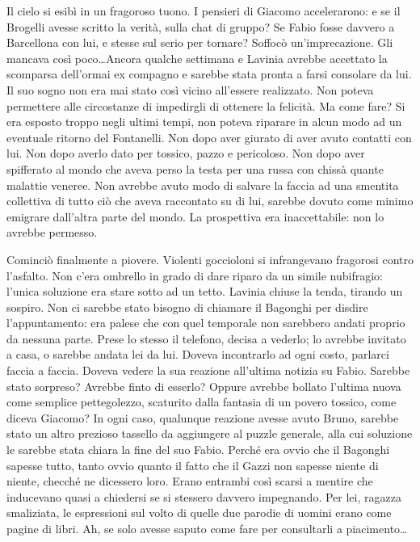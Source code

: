 Il cielo si esibì in un fragoroso tuono. I pensieri di Giacomo accelerarono: e se il Brogelli avesse scritto la verità, sulla chat di gruppo? Se Fabio fosse davvero a Barcellona con lui, e stesse sul serio per tornare? Soffocò un'imprecazione. Gli mancava così poco\ldots Ancora qualche settimana e Lavinia avrebbe accettato la scomparsa dell'ormai ex compagno e sarebbe stata pronta a farsi consolare da lui. Il suo sogno non era mai stato così vicino all'essere realizzato. Non poteva permettere alle circostanze di impedirgli di ottenere la felicità. Ma come fare? Si era esposto troppo negli ultimi tempi, non poteva riparare in alcun modo ad un eventuale ritorno del Fontanelli. Non dopo aver giurato di aver avuto contatti con lui. Non dopo averlo dato per tossico, pazzo e pericoloso. Non dopo aver spifferato al mondo che aveva perso la testa per una russa con chissà quante malattie veneree. Non avrebbe avuto modo di salvare la faccia ad una smentita collettiva di tutto ciò che aveva raccontato su di lui, sarebbe dovuto come minimo emigrare dall'altra parte del mondo. La prospettiva era inaccettabile: non lo avrebbe permesso.

Cominciò finalmente a piovere. Violenti goccioloni si infrangevano fragorosi contro l'asfalto. Non c'era ombrello in grado di dare riparo da un simile nubifragio: l'unica soluzione era stare sotto ad un tetto. Lavinia chiuse la tenda, tirando un sospiro. Non ci sarebbe stato bisogno di chiamare il Bagonghi per disdire l'appuntamento: era palese che con quel temporale non sarebbero andati proprio da nessuna parte. Prese lo stesso il telefono, decisa a vederlo; lo avrebbe invitato a casa, o sarebbe andata lei da lui. Doveva incontrarlo ad ogni costo, parlarci faccia a faccia. Doveva vedere la sua reazione all'ultima notizia su Fabio. Sarebbe stato sorpreso? Avrebbe finto di esserlo? Oppure avrebbe bollato l'ultima nuova come semplice pettegolezzo, scaturito dalla fantasia di un povero tossico, come diceva Giacomo? In ogni caso, qualunque reazione avesse avuto Bruno, sarebbe stato un altro prezioso tassello da aggiungere al puzzle generale, alla cui soluzione le sarebbe stata chiara la fine del suo Fabio. Perché era ovvio che il Bagonghi sapesse tutto, tanto ovvio quanto il fatto che il Gazzi non sapesse niente di niente, checché ne dicessero loro. Erano entrambi così scarsi a mentire che inducevano quasi a chiedersi se si stessero davvero impegnando. Per lei, ragazza smaliziata, le espressioni sul volto di quelle due parodie di uomini erano come pagine di libri. Ah, se solo avesse saputo come fare per consultarli a piacimento\ldots

